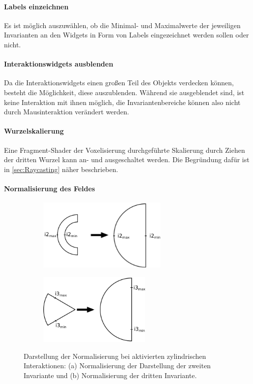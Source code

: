 \documentclass[a4paper,fontsize=12pt,toc=bib,parskip=half,ngerman]{scrartcl}
\begin{document}
\paragraph{Labels einzeichnen}
Es ist m\"oglich auszuw\"ahlen, ob die Minimal- und Maximalwerte der jeweiligen Invarianten an den Widgets in Form von Labels eingezeichnet werden sollen oder nicht.

\paragraph{Interaktionswidgets ausblenden}
Da die Interaktionswidgets einen gro{\ss}en Teil des Objekts verdecken k\"onnen, besteht die M\"oglichkeit, diese auszublenden. W\"ahrend sie ausgeblendet sind, ist keine Interaktion mit ihnen m\"oglich, die Invariantenbereiche k\"onnen also nicht durch Mausinteraktion ver\"andert werden.

\paragraph{Wurzelskalierung}
Eine Fragment-Shader der Voxelisierung durchgef\"uhrte Skalierung durch Ziehen der dritten Wurzel kann an- und ausgeschaltet werden. Die Begr\"undung daf\"ur ist in \cref{sec:Raycasting} n\"aher beschrieben.

\paragraph{Normalisierung des Feldes}
\begin{figure}
	\centering
	\begin{subfigure}{0.4\textwidth}
		\centering
		\includegraphics[height=3.5cm]{pictures/Scaling1.png}
		\subcaption{}
		\label{Scaling1}
	\end{subfigure}
	\hspace{2cm}
	\begin{subfigure}{0.4\textwidth}
		\centering
		\includegraphics[height=3.5cm]{pictures/Scaling2.png}
		\subcaption{}
		\label{Scaling2}
	\end{subfigure}
	\caption{Darstellung der Normalisierung bei aktivierten zylindrischen Interaktionen: (a) Normalisierung der Darstellung der zweiten Invariante und (b) Normalisierung der dritten Invariante.}
\end{figure}
\end{document}

